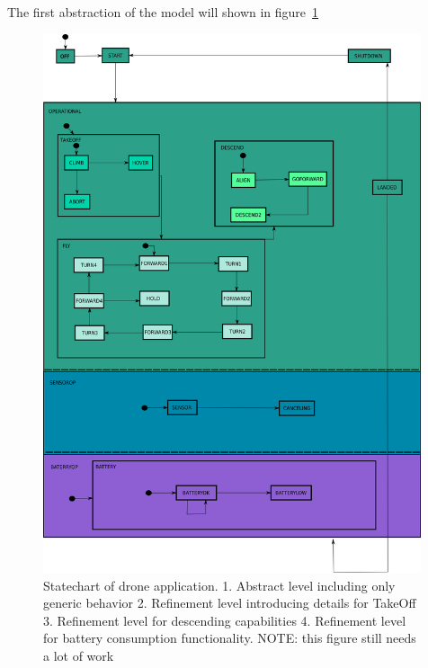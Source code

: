 The first abstraction of the model will shown in figure~\ref{fig:drone}
\begin{figure}[!h]
	\vspace{-.4cm}
	\centering
	\includegraphics[width=0.99\textwidth]{figures/drone.png}
	\caption{Statechart of drone application. 1. Abstract level including only generic behavior 
	2. Refinement level introducing details for TakeOff 3. Refinement level for descending capabilities 
	4. Refinement level for battery consumption functionality. NOTE: this figure still needs a lot of work}
	\label{fig:drone}
	\vspace{-.4cm}
\end{figure} 
